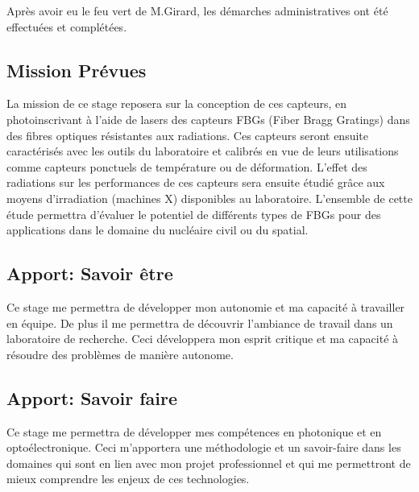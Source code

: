 \documentclass[11pt, openright]{book}
\begin{document}
        Après avoir eu le feu vert de M.Girard, les démarches administratives ont été effectuées et complétées.

         \subsection*{Mission Prévues}

         La mission de ce stage reposera sur la conception de ces capteurs, en photoinscrivant à l'aide de lasers des capteurs FBGs (Fiber Bragg Gratings) dans des fibres optiques résistantes aux radiations. Ces capteurs seront ensuite caractérisés avec les outils du laboratoire et calibrés en vue de leurs utilisations comme capteurs ponctuels de température ou de déformation. L'effet des radiations sur les performances de ces capteurs sera ensuite étudié grâce aux moyens d'irradiation (machines X) disponibles au laboratoire. L'ensemble de cette étude permettra d'évaluer le potentiel de différents types de FBGs pour des applications dans le domaine du nucléaire civil ou du spatial.

          \subsection*{Apport: Savoir être}

            Ce stage me permettra de développer mon autonomie et ma capacité à travailler en équipe. De plus il me permettra de découvrir l'ambiance de travail dans un laboratoire de recherche. Ceci développera mon esprit critique et ma capacité à résoudre des problèmes de manière autonome.

             \subsection*{Apport: Savoir faire}

                Ce stage me permettra de développer mes compétences en photonique et en optoélectronique. Ceci m'apportera une méthodologie et un savoir-faire dans les domaines qui sont en lien avec mon projet professionnel et qui me permettront de mieux comprendre les enjeux de ces technologies.
\end{document}
